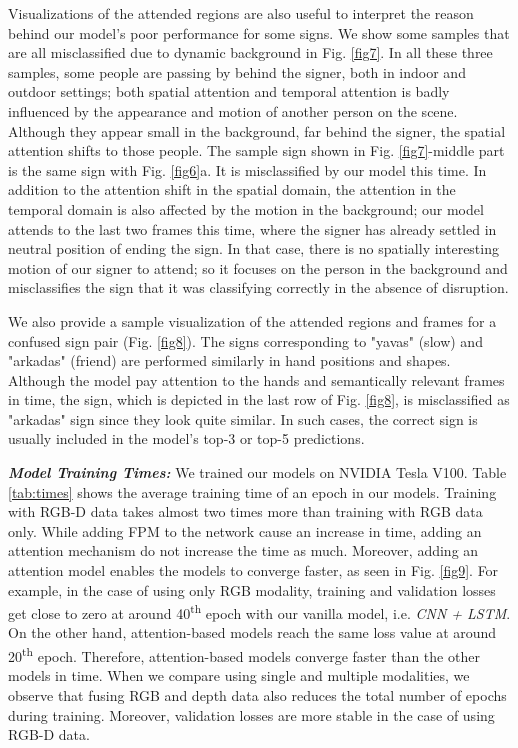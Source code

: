 \documentclass[11pt, a4paper, singlecolumn]{article}
\begin{document}
Visualizations of the attended regions are also useful to interpret the reason behind our model's poor performance for some signs. We show some samples that are all misclassified due to dynamic background in Fig. \ref{fig7}. In all these three samples, some people are passing by behind the signer, both in indoor and outdoor settings; both spatial attention and temporal attention is badly influenced by the appearance and motion of another person on the scene. Although they appear small in the background, far behind the signer, the spatial attention shifts to those people. The sample sign shown in Fig. \ref{fig7}-middle part is the same sign with Fig. \ref{fig6}a. It is misclassified by our model this time. In addition to the attention shift in the spatial domain, the attention in the temporal domain is also affected by the motion in the background; our model attends to the last two frames this time, where the signer has already settled in neutral position of ending the sign. In that case, there is no spatially interesting motion of our signer to attend; so it focuses on the person in the background and misclassifies the sign that it was classifying correctly in the absence of disruption.

We also provide a sample visualization of the attended regions and frames for a confused sign pair (Fig. \ref{fig8}). The signs corresponding to "yavas" (slow) and "arkadas" (friend) are performed similarly in hand positions and shapes. Although the model pay attention to the hands and semantically relevant frames in time, the sign, which is depicted in the last row of Fig. \ref{fig8}, is misclassified as "arkadas" sign since they look quite similar. In such cases, the correct sign is usually included in the model's top-3 or top-5 predictions.

\textit{\textbf{Model Training Times: }} We trained our models on NVIDIA Tesla V100. Table \ref{tab:times} shows the average training time of an epoch in our models. Training with RGB-D data takes almost two times more than training with RGB data only. While adding FPM to the network cause an increase in time, adding an attention mechanism do not increase the time as much. Moreover, adding an attention model enables the models to converge faster, as seen in Fig. \ref{fig9}. For example, in the case of using only RGB modality, training and validation losses get close to zero at around 40\textsuperscript{th} epoch with our vanilla model, i.e. \textit{CNN + LSTM}. On the other hand, attention-based models reach the same loss value at around 20\textsuperscript{th} epoch. Therefore, attention-based models converge faster than the other models in time. When we compare using single and multiple modalities, we observe that fusing RGB and depth data also reduces the total number of epochs during training. Moreover, validation losses are more stable in the case of using RGB-D data. 
\end{document}
